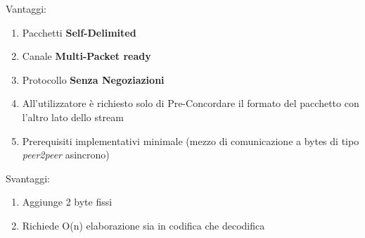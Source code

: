 \begin{multicols}{2}
	\begin{center}
		{\large Vantaggi:}
	\end{center}
	\begin{spacing}{1.25}
		\begin{enumerate}[itemsep=-1mm]
			\item Pacchetti {\color{Azure}\textbf{Self-Delimited}}
			\item Canale {\color{Azure}\textbf{Multi-Packet ready}}
			\item Protocollo {\color{Azure}\textbf{Senza Negoziazioni}}
			\item All’utilizzatore è richiesto solo di Pre-Concordare il formato del pacchetto con l’altro lato dello stream
			\item Prerequisiti implementativi minimale (mezzo di comunicazione a bytes di tipo \textit{peer2peer} asincrono)
		\end{enumerate}
	\end{spacing}
	\vfill
	\columnbreak
	\begin{center}
		{\large Svantaggi:}
	\end{center}
	\begin{spacing}{1.25}
		\begin{enumerate}[itemsep=-1mm]
			\item Aggiunge 2 byte fissi
			\item Richiede O(n) elaborazione sia in codifica che decodifica
		\end{enumerate}
	\end{spacing}
	\vspace*{\fill}
\end{multicols}

\newpage


